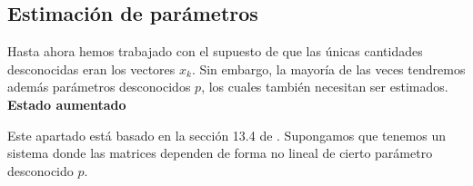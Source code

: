 








\subsection{Estimación de
parámetros}\label{estimacion-de-parametros}

Hasta ahora hemos trabajado con el supuesto de que las únicas cantidades desconocidas eran los vectores \(x_k\). Sin embargo, la mayoría de las veces tendremos además parámetros desconocidos \(p\), los cuales también necesitan ser estimados. \\

\noindent\textbf{Estado aumentado}

Este apartado está basado en la sección 13.4 de \cite{Simon2006}. Supongamos que tenemos un sistema donde las matrices dependen de forma no lineal de cierto parámetro desconocido \(p\). 

